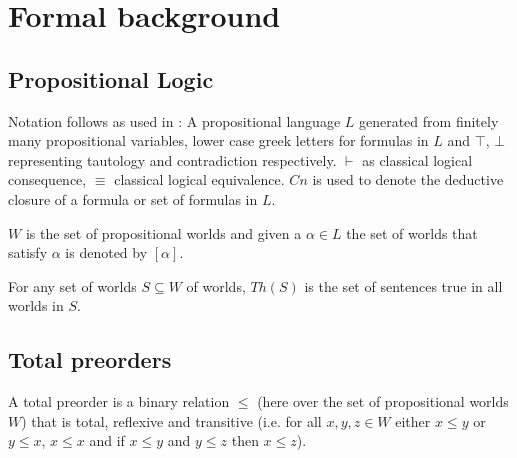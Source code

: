 \documentclass[11pt]{scrartcl}
\begin{document}
%

\section{Formal background}

\subsection{Propositional Logic} %
Notation follows as used in \cite{Booth2011}: A propositional language $L$ generated from finitely many propositional variables, lower case greek letters for formulas in $L$ and $\top$, $\bot$ representing tautology and contradiction respectively. $\vdash$ as classical logical consequence, $\equiv$ classical logical equivalence. $Cn$ is used to denote the deductive closure of a formula or set of formulas in $L$.

$W$ is the set of propositional worlds and given a $\alpha \in L$ the set of worlds that satisfy $\alpha$ is denoted by $[\alpha]$.

For any set of worlds $S \subseteq W$ of worlds, $Th(S)$ is the set of sentences true in all worlds in $S$.

\subsection{Total preorders}
A total preorder is a binary relation $\leq$ (here over the set of propositional worlds $W$) that is total, reflexive and transitive (i.e. for all $x, y, z \in W$ either $x \leq y$ or $y \leq x$, $x \leq x$ and if $x \leq y$ and $y \leq z$ then $x \leq z$).
\end{document}
